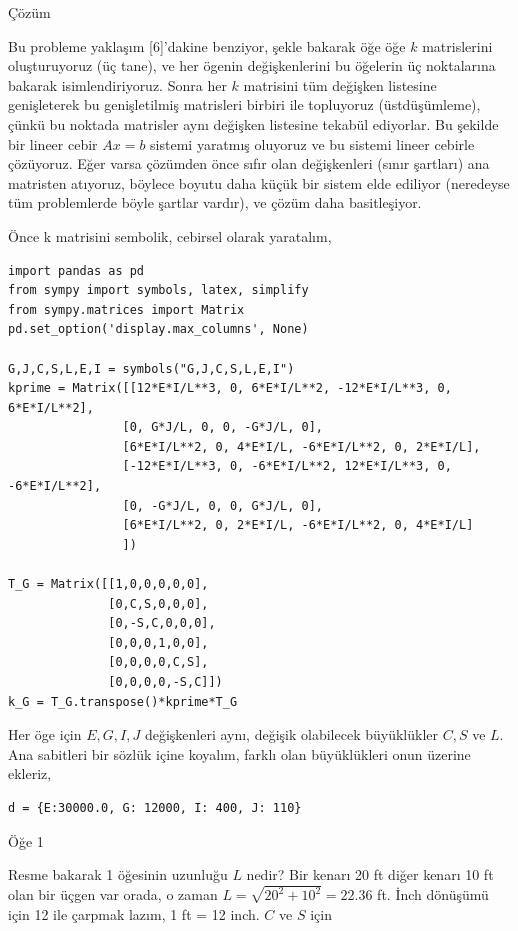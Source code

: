 \documentclass[12pt,fleqn]{article}\usepackage{../../common}
\begin{document}
Çözüm

Bu probleme yaklaşım [6]'dakine benziyor, şekle bakarak öğe öğe $k$ matrislerini
oluşturuyoruz (üç tane), ve her ögenin değişkenlerini bu öğelerin üç noktalarına
bakarak isimlendiriyoruz. Sonra her $k$ matrisini tüm değişken listesine
genişleterek bu genişletilmiş matrisleri birbiri ile topluyoruz (üstdüşümleme),
çünkü bu noktada matrisler aynı değişken listesine tekabül ediyorlar. Bu şekilde
bir lineer cebir $Ax = b$ sistemi yaratmış oluyoruz ve bu sistemi lineer cebirle
çözüyoruz. Eğer varsa çözümden önce sıfır olan değişkenleri (sınır şartları) ana
matristen atıyoruz, böylece boyutu daha küçük bir sistem elde ediliyor
(neredeyse tüm problemlerde böyle şartlar vardır), ve çözüm daha basitleşiyor.

Önce k matrisini sembolik, cebirsel olarak yaratalım,

\begin{verbatim}
import pandas as pd
from sympy import symbols, latex, simplify
from sympy.matrices import Matrix
pd.set_option('display.max_columns', None)

G,J,C,S,L,E,I = symbols("G,J,C,S,L,E,I")
kprime = Matrix([[12*E*I/L**3, 0, 6*E*I/L**2, -12*E*I/L**3, 0, 6*E*I/L**2],
                [0, G*J/L, 0, 0, -G*J/L, 0],
                [6*E*I/L**2, 0, 4*E*I/L, -6*E*I/L**2, 0, 2*E*I/L],
                [-12*E*I/L**3, 0, -6*E*I/L**2, 12*E*I/L**3, 0, -6*E*I/L**2],
                [0, -G*J/L, 0, 0, G*J/L, 0],
                [6*E*I/L**2, 0, 2*E*I/L, -6*E*I/L**2, 0, 4*E*I/L]
                ])

T_G = Matrix([[1,0,0,0,0,0],
              [0,C,S,0,0,0],
              [0,-S,C,0,0,0],
              [0,0,0,1,0,0],
              [0,0,0,0,C,S],
              [0,0,0,0,-S,C]])
k_G = T_G.transpose()*kprime*T_G
\end{verbatim}

Her öge için $E,G,I,J$ değişkenleri aynı, değişik olabilecek büyüklükler
$C,S$ ve $L$. Ana sabitleri bir sözlük içine koyalım, farklı olan büyüklükleri
onun üzerine ekleriz,

\begin{verbatim}
d = {E:30000.0, G: 12000, I: 400, J: 110}
\end{verbatim}

Öğe 1

Resme bakarak 1 öğesinin uzunluğu $L$ nedir? Bir kenarı 20 ft diğer kenarı 10 ft
olan bir üçgen var orada, o zaman $L = \sqrt{ 20^2 + 10^2} = 22.36$ ft. İnch
dönüşümü için 12 ile çarpmak lazım, 1 ft = 12 inch. $C$ ve $S$ için
\end{document}
